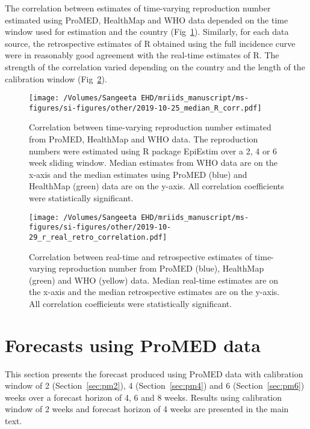 \documentclass[9pt,twoside,lineno]{pnas-new}
\begin{document}
The correlation between estimates of time-varying reproduction number 
estimated using ProMED, HealthMap and WHO data depended on the
time window used for estimation and the country
(Fig~\ref{fig:rcorr}). Similarly, for each data source, the
retrospective estimates of R obtained using the full incidence curve
were in reasonably good agreement with the real-time estimates of R.
The strength of the correlation varied depending on the country and
the length of the calibration window (Fig~\ref{fig:rcorrrealretro}).

\begin{figure}
  \centering
  \texttt{[image: /Volumes/Sangeeta EHD/mriids\_manuscript/ms-figures/si-figures/other/2019-10-25\_median\_R\_corr.pdf]}
  \caption{Correlation between time-varying reproduction number estimated from
    ProMED, HealthMap and WHO data. The reproduction numbers were
    estimated using R package EpiEstim over a 2, 4 or 6 week sliding
    window. Median estimates from WHO data are on the x-axis and the
    median estimates using ProMED (blue) and HealthMap (green) data
    are on the y-axis. All correlation coefficients were statistically
  significant.}
  \label{fig:rcorr}
\end{figure}\FloatBarrier


\begin{figure}
  \centering
  \texttt{[image: /Volumes/Sangeeta EHD/mriids\_manuscript/ms-figures/si-figures/other/2019-10-29\_r\_real\_retro\_correlation.pdf]}
  \caption{Correlation between real-time and retrospective estimates
    of time-varying reproduction number from
    ProMED (blue), HealthMap (green) and WHO (yellow) data. 
    Median real-time estimates are on the x-axis and the
    median retrospective estimates are on the y-axis. 
   All correlation coefficients were statistically significant.}
  \label{fig:rcorrrealretro}
\end{figure}\FloatBarrier

\section{Forecasts using ProMED data}\label{sec:pm} 

This section presents the forecast produced using ProMED data with
calibration window of 2 (Section~\ref{sec:pm2}), 
4 (Section~\ref{sec:pm4}) and 6 
(Section~\ref{sec:pm6}) weeks over a 
forecast horizon of 4, 6 and 8 weeks. Results using calibration window
of 2 weeks and forecast horizon of 4 weeks are presented in the main
text.
\end{document}
